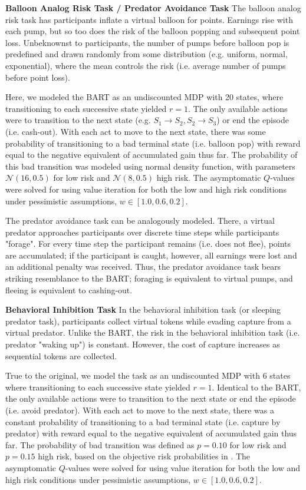 \documentclass[11pt]{article} %
\begin{document}
\textbf{Balloon Analog Risk Task / Predator Avoidance Task} The balloon analog risk task \citep{Lejuez2002} has participants inflate a virtual balloon for points. Earnings rise with each pump, but so too does the risk of the balloon popping and subsequent point loss. Unbeknownst to participants, the number of pumps before balloon pop is predefined and drawn randomly from some distribution (e.g. uniform, normal, exponential), where the mean controls the risk (i.e. average number of pumps before point loss). 

Here, we modeled the BART as an undiscounted MDP with 20 states, where transitioning to each successive state yielded $r=1$. The only available actions were to transition to the next state (e.g. $S_1 \rightarrow S_2, S_2 \rightarrow S_3$) or end the episode (i.e. cash-out). With each act to move to the next state, there was some probability of transitioning to a bad terminal state (i.e. balloon pop) with reward equal to the negative equivalent of accumulated gain thus far. The probability of this bad transition was modeled using normal density function, with parameters $\mathcal{N}(16,0.5)$ for low risk and $\mathcal{N}(8,0.5)$ high risk. The asymptomatic $Q$-values were solved for using value iteration for both the low and high risk conditions under pessimistic assumptions, $w \in [1.0, 0.6, 0.2]$.

The predator avoidance task \citep{Mobbs2019} can be analogously modeled. There, a virtual predator approaches participants over discrete time steps while participants "forage". For every time step the participant remains (i.e. does not flee), points are accumulated; if the participant is caught, however, all earnings were lost and an additional penalty was received. Thus, the predator avoidance task bears striking resemblance to the BART; foraging is equivalent to virtual pumps, and fleeing is equivalent to cashing-out.  

\textbf{Behavioral Inhibition Task} In the behavioral inhibition task \citep{bach2015} (or sleeping predator task), participants collect virtual tokens while evading capture from a virtual predator. Unlike the BART, the risk in the behavioral inhibition task (i.e. predator "waking up") is constant. However, the cost of capture increases as sequential tokens are collected.

True to the original, we model the task as an undiscounted MDP with 6 states where transitioning to each successive state yielded $r=1$. Identical to the BART, the only available actions were to transition to the next state or end the episode (i.e. avoid predator). With each act to move to the next state, there was a constant probability of transitioning to a bad terminal state (i.e. capture by predator) with reward equal to the negative equivalent of accumulated gain thus far. The probability of bad transition was defined as $p = 0.10$ for low risk and $p = 0.15$ high risk, based on the objective risk probabilities in \citep{bach2015}. The asymptomatic $Q$-values were solved for using value iteration for both the low and high risk conditions under pessimistic assumptions, $w \in [1.0, 0.6, 0.2]$.
\end{document}
